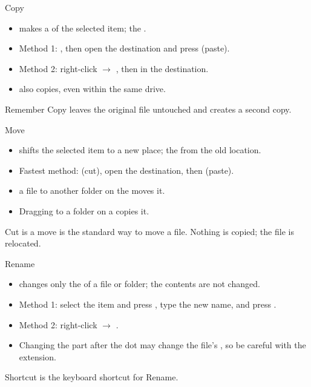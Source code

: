 \documentclass[aspectratio=169]{beamer}
\begin{document}
\begin{frame}{Copy}
  \begin{itemize}
    \item {} makes a  of the selected item; the
      .
    \item Method 1: , then open the
      destination and press  (paste).
    \item Method 2: right-click $\rightarrow$ , then
       in the destination.
    \item {} also copies, even within the
      same drive.
  \end{itemize}
  \begin{alertblock}{Remember}
    Copy leaves the original file untouched and creates a second copy.
  \end{alertblock}
\end{frame}

\begin{frame}{Move}
  \begin{itemize}
    \item {} shifts the selected item to a new place; the
       from the old location.
    \item Fastest method:  (cut), open the
      destination, then  (paste).
    \item {} a file to another folder on the 
      moves it.
    \item Dragging to a folder on a  copies it.
  \end{itemize}
  \begin{exampleblock}{Cut is a move}
     is the standard way to move a file. Nothing is copied;
    the file is relocated.
  \end{exampleblock}
\end{frame}

\begin{frame}{Rename}
  \begin{itemize}
    \item {} changes only the  of a file or folder; the
      contents are not changed.
    \item Method 1: select the item and press , type the new name,
      and press .
    \item Method 2: right-click $\rightarrow$ .
    \item Changing the part after the dot may change the file's
      , so be careful with the extension.
  \end{itemize}
  \begin{alertblock}{Shortcut}
     is the keyboard shortcut for Rename.
  \end{alertblock}
\end{frame}
\end{document}
